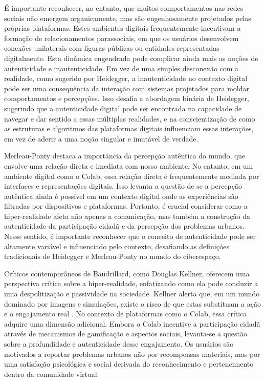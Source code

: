 É importante reconhecer, no entanto, que muitos comportamentos nas redes sociais não emergem organicamente, mas são engenhosamente projetados pelas próprias plataformas. Estes ambientes digitais frequentemente incentivam a formação de relacionamentos parassociais, em que os usuários desenvolvem conexões unilaterais com figuras públicas ou entidades representadas digitalmente. Esta dinâmica engendrada pode complicar ainda mais as noções de autenticidade e inautenticidade. Em vez de uma simples desconexão com a realidade, como sugerido por Heidegger, a inautenticidade no contexto digital pode ser uma consequência da interação com sistemas projetados para moldar comportamentos e percepções. Isso desafia a abordagem binária de Heidegger, sugerindo que a autenticidade digital pode ser encontrada na capacidade de navegar e dar sentido a essas múltiplas realidades, e na conscientização de como as estruturas e algoritmos das plataformas digitais influenciam essas interações, em vez de aderir a uma noção singular e imutável de verdade.


Merleau-Ponty destaca a importância da percepção autêntica do mundo, que envolve uma relação direta e imediata com nosso ambiente. No entanto, em um ambiente digital como o Colab, essa relação direta é frequentemente mediada por interfaces e representações digitais. Isso levanta a questão de se a percepção autêntica ainda é possível em um contexto digital onde as experiências são filtradas por dispositivos e plataformas. Portanto, é crucial considerar como a hiper-realidade afeta não apenas a comunicação, mas também a construção da autenticidade da participação cidadã e da percepção dos problemas urbanos. Nesse sentido, é importante reconhecer que o conceito de autenticidade pode ser altamente variável e influenciado pelo contexto, desafiando as definições tradicionais de Heidegger e Merleau-Ponty no mundo do ciberespaço.

Críticos contemporâneos de Baudrillard, como Douglas Kellner, oferecem uma perspectiva crítica sobre a hiper-realidade, enfatizando como ela pode conduzir a uma despolitização e passividade na sociedade. Kellner alerta que, em um mundo dominado por imagens e simulações, existe o risco de que estas substituam a ação e o engajamento real \cite{1995_Kellner_BOOK}. No contexto de plataformas como o Colab, essa crítica adquire uma dimensão adicional. Embora o Colab incentive a participação cidadã através de mecanismos de gamificação e aspectos sociais, levanta-se a questão sobre a profundidade e autenticidade desse engajamento. Os usuários são motivados a reportar problemas urbanos não por recompensas materiais, mas por uma satisfação psicológica e social derivada do reconhecimento e pertencimento dentro da comunidade virtual.

